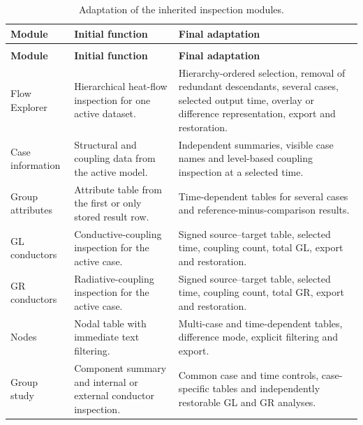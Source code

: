 \begingroup
\small
\renewcommand{\arraystretch}{1.66}
\setlength{\tabcolsep}{3.5pt}
\begin{longtable}{|>{\raggedright\arraybackslash}p{}|>{\raggedright\arraybackslash}p{}|>{\raggedright\arraybackslash}p{}|}
    \caption{Adaptation of the inherited inspection modules.}
    \label{tab:appendix_inherited_module_summary}\\
    \hline
    \textbf{Module} & \textbf{Initial function} & \textbf{Final adaptation} \\
    \hline
    \endfirsthead

    \multicolumn{3}{c}{\tablename\ \thetable\ -- continued}\\
    \hline
    \textbf{Module} & \textbf{Initial function} & \textbf{Final adaptation} \\
    \hline
    \endhead

    \hline
    \endfoot

    Flow Explorer &
    Hierarchical heat-flow inspection for one active dataset. &
    Hierarchy-ordered selection, removal of redundant descendants, several
    cases, selected output time, overlay or difference representation, export
    and restoration. \\
    \hline
    Case information &
    Structural and coupling data from the active model. &
    Independent summaries, visible case names and level-based coupling
    inspection at a selected time. \\
    \hline
    Group attributes &
    Attribute table from the first or only stored result row. &
    Time-dependent tables for several cases and
    reference-minus-comparison results. \\
    \hline
    GL conductors &
    Conductive-coupling inspection for the active case. &
    Signed source--target table, selected time, coupling count, total GL,
    export and restoration. \\
    \hline
    GR conductors &
    Radiative-coupling inspection for the active case. &
    Signed source--target table, selected time, coupling count, total GR,
    export and restoration. \\
    \hline
    Nodes &
    Nodal table with immediate text filtering. &
    Multi-case and time-dependent tables, difference mode, explicit filtering
    and export. \\
    \hline
    Group study &
    Component summary and internal or external conductor inspection. &
    Common case and time controls, case-specific tables and independently
    restorable GL and GR analyses. \\
    \hline
\end{longtable}
\endgroup
